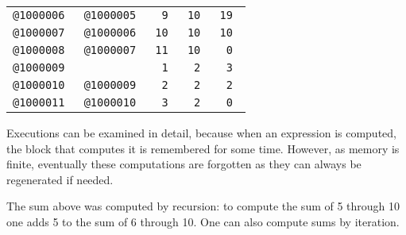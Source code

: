 \documentclass[12pt]{article}
\newenvironment{indpar}[1][0.3in]%
	{\begin{list}{}%
		     {\setlength{\itemsep}{0in}%
		      \setlength{\topsep}{0in}%
		      \setlength{\parsep}{1ex}%
		      \setlength{\labelwidth}{#1}%
		      \setlength{\leftmargin}{#1}%
		      \addtolength{\leftmargin}{\labelsep}}%
	 \item}%
	{\end{list}}
\begin{document}
\begin{indpar}
\begin{tabular}{|r|r|r|r|r|}
\tt @1000006 & \tt @1000005	& \tt 9		& \tt	10	& \tt 19 \\
\tt @1000007 & \tt @1000006	& \tt 10	& \tt	10	& \tt 10 \\
\tt @1000008 & \tt @1000007	& \tt 11	& \tt	10	& \tt 0 \\
\tt @1000009 &       		& \tt 1		& \tt	2	& \tt 3 \\
\tt @1000010 & \tt @1000009	& \tt 2		& \tt	2	& \tt 2 \\
\tt @1000011 & \tt @1000010	& \tt 3		& \tt	2	& \tt 0 \\
\hline
\end{tabular}
\end{indpar}

Executions can be examined in detail, because
when an expression is computed, the block that computes it is remembered
for some time.  However, as memory is finite, eventually these
computations are forgotten as they can always be regenerated if
needed.

The sum above was computed by recursion: to compute the sum of 5 through 10
one adds 5 to the sum of 6 through 10.  One can also compute sums by
iteration.
\end{document}
